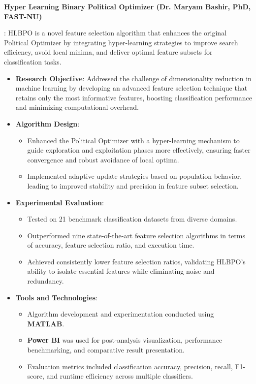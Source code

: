 \documentclass[letterpaper,10pt]{article}
\newcommand{\resumeItem}[2]{
  \item\small{
    \textbf{#1}{: #2 \vspace{-2pt}}
  }
}
\newcommand{\resumeSubItem}[2]{\resumeItem{#1}{#2}\vspace{-4pt}}
\begin{document}
\resumeSubItem{Hyper Learning Binary Political Optimizer (Dr. Maryam Bashir, PhD, FAST-NU)}
{HLBPO is a novel feature selection algorithm that enhances the original Political Optimizer by integrating hyper-learning strategies to improve search efficiency, avoid local minima, and deliver optimal feature subsets for classification tasks.
\begin{itemize}
    \item \textbf{Research Objective}: Addressed the challenge of dimensionality reduction in machine learning by developing an advanced feature selection technique that retains only the most informative features, boosting classification performance and minimizing computational overhead.
    \item \textbf{Algorithm Design}:
    \begin{itemize}
        \item Enhanced the Political Optimizer with a hyper-learning mechanism to guide exploration and exploitation phases more effectively, ensuring faster convergence and robust avoidance of local optima.
        \item Implemented adaptive update strategies based on population behavior, leading to improved stability and precision in feature subset selection.
    \end{itemize}
    \item \textbf{Experimental Evaluation}:
    \begin{itemize}
        \item Tested on 21 benchmark classification datasets from diverse domains.
        \item Outperformed nine state-of-the-art feature selection algorithms in terms of accuracy, feature selection ratio, and execution time.
        \item Achieved consistently lower feature selection ratios, validating HLBPO’s ability to isolate essential features while eliminating noise and redundancy.
    \end{itemize}
    \item \textbf{Tools and Technologies}:
    \begin{itemize}
        \item Algorithm development and experimentation conducted using \textbf{MATLAB}.
        \item \textbf{Power BI} was used for post-analysis visualization, performance benchmarking, and comparative result presentation.
        \item Evaluation metrics included classification accuracy, precision, recall, F1-score, and runtime efficiency across multiple classifiers.

\end{itemize}
\end{itemize}}
\end{document}
